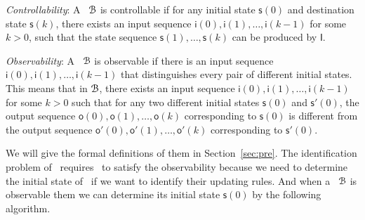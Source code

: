 {\em Controllability}: A \BCN\ ${\mathcal{B}}$ is controllable if for any initial state $\mathsf{s}(0)$ and destination state $\mathsf{s}(k)$, there exists an input sequence $\mathsf{i}(0),\mathsf{i}(1),\ldots,\mathsf{i}(k-1)$ for some $k>0$, such that the state sequence $\mathsf{s}(1),\ldots, \mathsf{s}(k)$ can be produced by $\mathsf{I}$.

{\em Observability}:
A \BCN\ ${\mathcal{B}}$ is observable if there is an input sequence $\mathsf{i}(0),\mathsf{i}(1),\ldots, \mathsf{i}(k-1)$ that distinguishes every pair of different initial states. This means that in ${\mathcal{B}}$, there exists an input sequence  $\mathsf{i}(0),\mathsf{i}(1), \ldots,\mathsf{i}(k-1)$ for some $k>0$ such that for any two different initial states $\mathsf{s}(0)$ and $\mathsf{s}'(0)$, the output sequence $\mathsf{o}(0),\mathsf{o}(1), \ldots, \mathsf{o}(k)$  corresponding to  $\mathsf{s}(0)$  is different from the output sequence  $\mathsf{o}'(0),\mathsf{o}'(1),\ldots, \mathsf{o}'(k)$ corresponding to $\mathsf{s}'(0)$.

 We will give the formal definitions of them in Section~\ref{sec:pre}. The identification problem of \BCNs\ requires \BCNs\ to satisfy the observability because we need to determine the initial state of \BCNs\ if we want to identify their updating rules. And when a \BCN\ ${\mathcal{B}}$ is observable them we can determine its initial state $\mathsf{s}(0)$ by the following algorithm.



%

